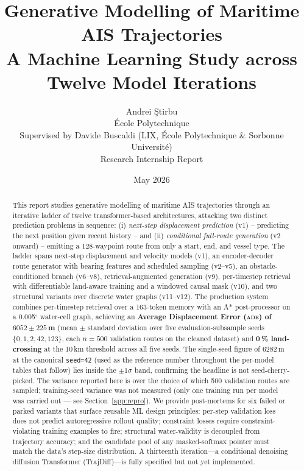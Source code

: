 \documentclass[11pt,a4paper]{article}
\title{\textbf{Generative Modelling of Maritime AIS Trajectories}\\[0.5em]
       \large A Machine Learning Study across Twelve Model Iterations}
\author{Andrei \c{S}tirbu\\[0.3em]
        \normalsize \'Ecole Polytechnique\\[0.2em]
        \normalsize Supervised by Davide Buscaldi (LIX, \'Ecole Polytechnique \& Sorbonne Universit\'e)\\[0.2em]
        \normalsize Research Internship Report}
\date{May 2026}
\newcommand{\ade}{\textsc{ade}}
\begin{document}
\maketitle
\thispagestyle{empty}

\begin{abstract}
This report studies generative modelling of maritime AIS trajectories through
an iterative ladder of twelve transformer-based architectures, attacking two
distinct prediction problems in sequence: (i) \emph{next-step displacement
prediction} (v1) -- predicting the next position given recent history -- and
(ii) \emph{conditional full-route generation} (v2 onward) -- emitting a
128-waypoint route from only a start, end, and vessel type.
The ladder spans next-step displacement and velocity models (v1),
an encoder-decoder route generator with bearing features and scheduled sampling
(v2--v5), an obstacle-conditioned branch (v6--v8), retrieval-augmented
generation (v9), per-timestep retrieval with differentiable land-aware training
and a windowed causal mask (v10), and two structural variants over discrete
water graphs (v11--v12).
The production system combines per-timestep retrieval over a 163-token memory
with an A* post-processor on a 0.005$^{\circ}$ water-cell graph, achieving
an \textbf{Average Displacement Error (\ade) of
$6052 \pm 225$\,m} (mean $\pm$ standard deviation over five evaluation-subsample
seeds $\{0,1,2,42,123\}$, each $n=500$ validation routes on the cleaned dataset)
and \textbf{0\,\% land-crossing} at the 10\,km threshold across all five seeds.
The single-seed figure of 6282\,m at the canonical \texttt{seed=42} (used as the
reference number throughout the per-model tables that follow) lies inside the
$\pm 1\sigma$ band, confirming the headline is not seed-cherry-picked.
The variance reported here is over the choice of which 500 validation routes are
sampled; training-seed variance was not measured (only one training run per model
was carried out --- see Section~\ref{app:repro}).
We provide post-mortems for six failed or parked variants that surface
reusable ML design principles: per-step validation loss does not predict
autoregressive rollout quality; constraint losses require constraint-violating
training examples to fire; structural water-validity is decoupled from
trajectory accuracy; and the candidate pool of any masked-softmax pointer
must match the data's step-size distribution.
A thirteenth iteration---a conditional denoising diffusion Transformer
(TrajDiff)---is fully specified but not yet implemented.
\end{abstract}
\end{document}
